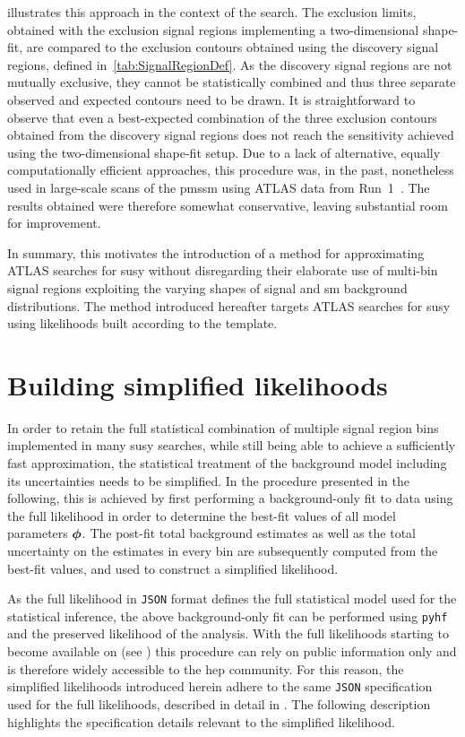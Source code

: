  illustrates this approach in the context of the \onelepton search. The exclusion limits, obtained with the exclusion signal regions implementing a two-dimensional shape-fit, are compared to the exclusion contours obtained using the discovery signal regions, defined in~\cref{tab:SignalRegionDef}.
As the discovery signal regions are not mutually exclusive, they cannot be statistically combined and thus three separate observed and expected contours need to be drawn. It is straightforward to observe that even a best-expected combination of the three exclusion contours obtained from the discovery signal regions does not reach the sensitivity achieved using the two-dimensional shape-fit setup.
Due to a lack of alternative, equally computationally efficient approaches, this procedure was, in the past, nonetheless used in large-scale scans of the \gls{pmssm} using ATLAS data from Run~1~\cite{pMSSM-scan-run1:2015baa,Aaboud:2016wna}. The results obtained were therefore somewhat conservative, leaving substantial room for improvement.

In summary, this motivates the introduction of a method for approximating ATLAS searches for \gls{susy} without disregarding their elaborate use of multi-bin signal regions exploiting the varying shapes of signal and \gls{sm} background distributions. The method introduced hereafter targets ATLAS searches for \gls{susy} using likelihoods built according to the  template.

\section{Building simplified likelihoods}\label{sec:building_simplified_likelihoods}

In order to retain the full statistical combination of multiple signal region bins implemented in many \gls{susy} searches, while still being able to achieve a sufficiently fast approximation, the statistical treatment of the background model including its uncertainties needs to be simplified.
In the procedure presented in the following, this is achieved by first performing a background-only fit to data using the full likelihood in order to determine the best-fit values of all model parameters $\makemebold{\phi}$.
The post-fit total background estimates as well as the total uncertainty on the estimates in every bin are subsequently computed from the best-fit values, and used to construct a simplified likelihood.

As the full likelihood in \texttt{JSON} format defines the full statistical model used for the statistical inference, the above background-only fit can be performed using \texttt{pyhf} and the preserved likelihood of the analysis.
With the full likelihoods starting to become available on  (see \eg {}\cite{fullLH_1Lbb}) this procedure can rely on public information only and is therefore widely accessible to the \gls{hep} community.
For this reason, the simplified likelihoods introduced herein adhere to the same \texttt{JSON} specification used for the full likelihoods, described in detail in \cite{ATL-PHYS-PUB-2019-029}.
The following description highlights the specification details relevant to the simplified likelihood. 

